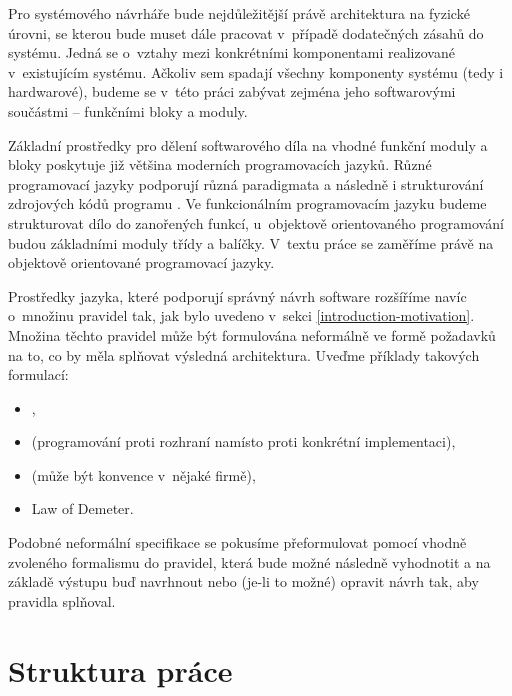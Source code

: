 Pro systémového návrháře bude nejdůležitější právě architektura na fyzické úrovni, se kterou bude muset dále pracovat v~případě dodatečných zásahů do systému. Jedná se o~vztahy mezi konkrétními komponentami realizované v~existujícím systému. Ačkoliv sem spadají všechny komponenty systému (tedy i hardwarové), budeme se v~této práci zabývat zejména jeho softwarovými součástmi -- funkčními bloky a moduly.

Základní prostředky pro dělení softwarového díla na vhodné funkční moduly a bloky poskytuje již většina moderních programovacích jazyků. Různé programovací jazyky podporují různá paradigmata a následně i strukturování zdrojových kódů programu \cite{wiki:programming_paradigm}. Ve funkcionálním programovacím jazyku budeme strukturovat dílo do zanořených funkcí, u~objektově orientovaného programování budou základními moduly třídy a balíčky. V~textu práce se zaměříme právě na objektově orientované programovací jazyky.

Prostředky jazyka, které podporují správný návrh software rozšíříme navíc o~množinu pravidel tak, jak bylo uvedeno v~sekci \ref{introduction-motivation}. Množina těchto pravidel může být formulována neformálně ve formě požadavků na to, co by měla splňovat výsledná architektura. Uveďme příklady takových formulací:

\begin{itemize}
\item {},
\item {} (programování proti rozhraní namísto proti konkrétní implementaci),
\item {} (může být konvence v~nějaké firmě),
\item Law of Demeter.
\end{itemize}

Podobné neformální specifikace se pokusíme přeformulovat pomocí vhodně zvoleného formalismu do pravidel, která bude možné následně vyhodnotit a na základě výstupu buď navrhnout nebo (je-li to možné) opravit návrh tak, aby pravidla splňoval.

\section{Struktura práce}

